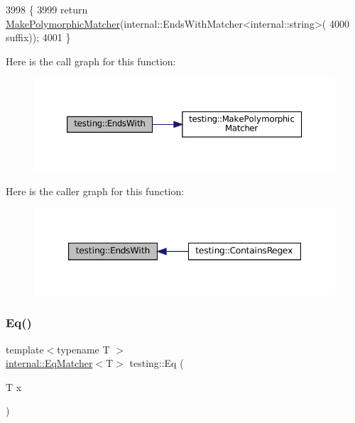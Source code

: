 \begin{DoxyCode}
3998                                            \{
3999   \textcolor{keywordflow}{return} \hyperlink{namespacetesting_a667ca94f190ec2e17ee2fbfdb7d3da04}{MakePolymorphicMatcher}(internal::EndsWithMatcher<internal::string>(
4000       suffix));
4001 \}
\end{DoxyCode}
Here is the call graph for this function\+:
\nopagebreak
\begin{figure}[H]
\begin{center}
\leavevmode
\includegraphics[width=350pt]{namespacetesting_aec11c4e418a835ca2c0c3cbdb29b28ba_cgraph}
\end{center}
\end{figure}
Here is the caller graph for this function\+:
\nopagebreak
\begin{figure}[H]
\begin{center}
\leavevmode
\includegraphics[width=347pt]{namespacetesting_aec11c4e418a835ca2c0c3cbdb29b28ba_icgraph}
\end{center}
\end{figure}
\mbox{\label{namespacetesting_a0cb8ba7eae844c871eccb29e7c81635f}} 
\subsubsection{\texorpdfstring{Eq()}{Eq()}\hspace{0.1cm}{\footnotesize\ttfamily [1/2]}}
{\footnotesize\ttfamily template$<$typename T $>$ \\
\hyperlink{classtesting_1_1internal_1_1EqMatcher}{internal\+::\+Eq\+Matcher}$<$T$>$ testing\+::\+Eq (\begin{DoxyParamCaption}\item[{T}]{x }\end{DoxyParamCaption})\hspace{0.3cm}{\ttfamily [inline]}}



